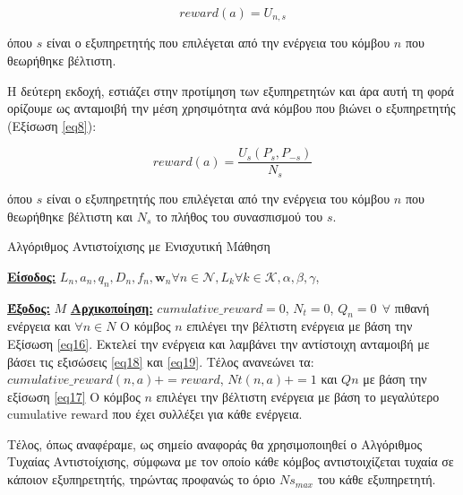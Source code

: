 \begin{equation}
    reward(a) = U_{n,s}
    \label{eq18}
\end{equation}

\noindent
όπου $s$ είναι ο εξυπηρετητής που επιλέγεται από την ενέργεια του κόμβου $n$ που θεωρήθηκε βέλτιστη.

Η δεύτερη εκδοχή, εστιάζει στην προτίμηση των εξυπηρετητών και άρα αυτή τη φορά ορίζουμε ως ανταμοιβή την μέση χρησιμότητα ανά κόμβου που βιώνει ο εξυπηρετητής (Εξίσωση \ref{eq8}):

\begin{equation}
    reward(a) = \frac{U_s(P_s,P_{-s})}{N_s}
    \label{eq19}
\end{equation}

\noindent
όπου $s$ είναι ο εξυπηρετητής που επιλέγεται από την ενέργεια του κόμβου $n$ που θεωρήθηκε βέλτιστη και $N_s$ το πλήθος του συνασπισμού του $s$.

\newpage

\begin{algorithm}[h]
\caption{Αλγόριθμος Αντιστοίχισης με Ενισχυτική Μάθηση} \label{algorithm 3}
\begin{algorithmic}[1]
\STATE \textbf{\underline{Είσοδος:}} ${L_n, a_n, q_n, D_n, f_n, \mathbf{w}_n}{\forall n\in \mathcal{N}}, {L_k}{\forall k \in \mathcal{K}}, \alpha,\beta,\gamma$,

\STATE \textbf{\underline{Έξοδος:}}  $M$
\STATE \textbf{\underline{Αρχικοποίηση:}} $cumulative\_reward = 0$, $N_t = 0$, $Q_n = 0 \>\> \forall$ πιθανή ενέργεια και $\forall n \in N$
\STATE Ο κόμβος $n$ επιλέγει την βέλτιστη ενέργεια με βάση την Εξίσωση \ref{eq16}.
\STATE Εκτελεί την ενέργεια και λαμβάνει την αντίστοιχη ανταμοιβή με βάσει τις εξισώσεις \ref{eq18} και \ref{eq19}.
\STATE Τέλος ανανεώνει τα: $cumulative\_reward(n,a) += reward$, $Nt(n,a) += 1$ και $Qn$ με βάση την εξίσωση \ref{eq17}
\ENDFOR
\ENDWHILE
{}
\STATE Ο κόμβος $n$ επιλέγει την βέλτιστη ενέργεια με βάση το μεγαλύτερο cumulative reward που έχει συλλέξει για κάθε ενέργεια.
\ENDFOR
\end{algorithmic}
\end{algorithm}
\vspace{-7pt}

Τέλος, όπως αναφέραμε, ως σημείο αναφοράς θα χρησιμοποιηθεί ο Αλγόριθμος Τυχαίας Αντιστοίχισης, σύμφωνα με τον οποίο κάθε κόμβος αντιστοιχίζεται τυχαία σε κάποιον εξυπηρετητής, τηρώντας προφανώς το όριο $Ns_{max}$ του κάθε εξυπηρετητή.

